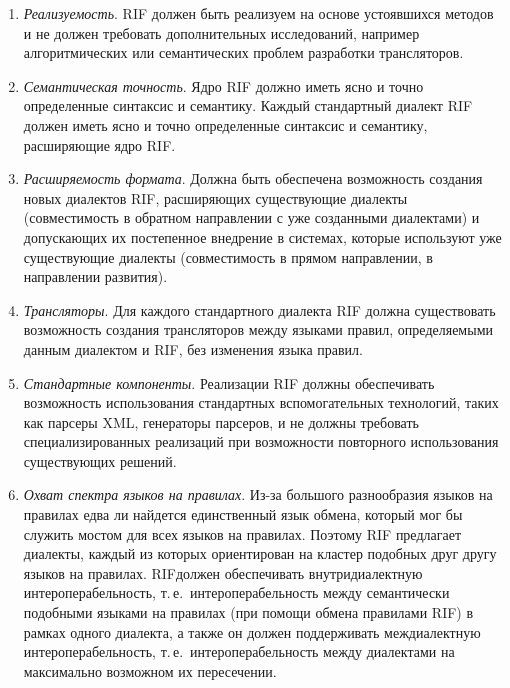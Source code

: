 \begin{multicols}{2}
\noindent
\begin{enumerate}[1.]
\item \textit{Реализуемость}. RIF должен быть реализуем на основе устоявшихся методов и не должен 
требовать дополнительных исследований, например алгоритмических или семантических проблем 
разработки трансляторов.
\item  \textit{Семантическая точность}. Ядро RIF должно иметь ясно и точно определенные синтаксис и 
семантику. Каждый стандартный диалект RIF должен иметь ясно и точно определенные синтаксис и 
семантику, расширяющие ядро RIF.
\item  \textit{Расширяемость формата}. Должна быть обеспечена возможность создания новых диалектов 
RIF, расширяющих существующие диалекты (совместимость в обратном направлении с уже созданными 
диалектами) и допускающих их постепенное внедрение в системах, которые используют уже 
существующие диалекты (совместимость в прямом направлении, в направлении развития).
\item  \textit{Трансляторы}. Для каждого стандартного диалекта RIF должна существовать возможность 
создания трансляторов между языками правил, определяемыми данным диалектом и RIF, без изменения 
языка правил.
\item  \textit{Стандартные компоненты}. Реализации RIF должны обеспечивать возможность 
использования стандартных вспомогательных технологий, таких как парсеры XML, генераторы 
\mbox{парсеров}, и 
не должны требовать специализированных реализаций при возможности повторного использования 
существующих решений.
\item  \textit{Охват спектра языков на правилах}. Из-за большого разнообразия языков на правилах едва ли 
найдется единственный язык обмена, который\linebreak
 мог бы служить мостом для всех языков на правилах. 
Поэтому RIF предлагает диалекты, каж\-дый из которых ориентирован на кластер подобных друг другу 
языков на правилах. RIF\linebreak должен обеспечивать внутридиалектную интероперабельность, т.\,е.\ 
интероперабельность между семантически подобными языками на правилах (при помощи обмена 
правилами RIF) в рамках одного диалекта, а также он должен поддерживать междиалектную 
интероперабельность, т.\,е.\ интероперабельность между диалектами на максимально возможном их 
пересечении.
\end{enumerate}

\vspace*{-9pt}


\end{multicols}
